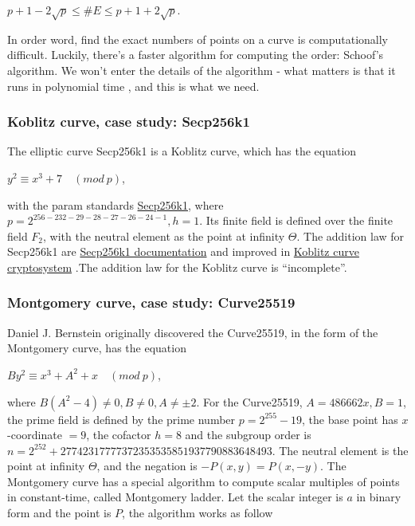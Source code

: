 \begin{center}
  $p+1-2\sqrt{p} \leq \#E \leq p+1+2\sqrt{p}$.
\end{center}

In order word, find the exact numbers of points on a curve is computationally difficult. Luckily, there's a faster algorithm for computing the order: Schoof's algorithm. We won't enter the details of the algorithm - what matters is that it runs in polynomial time \cite{Schoof}, and this is what we need.

\subsubsection{Koblitz curve, case study: Secp256k1}
The elliptic curve Secp256k1 is a Koblitz curve, which has the equation

\begin{center}
  $y^2 \equiv x^3 + 7 \quad (mod \ p)$,
\end{center}

with the param standards \href{https://en.bitcoin.it/wiki/Secp256k1}{Secp256k1}, where $p = 2^{256 - 232 - 29 - 28 - 27 - 26 - 24 - 1}, h = 1$. Its finite field is defined over the finite field $F_2$, with the neutral element as the point at infinity $\Theta$. The addition law for Secp256k1 are \href{https://www.researchgate.net/publication/332783847_Arithmetic_of_Koblitz_Curve_Secp256k1_Used_in_Bitcoin_Cryptocurrency_Based_on_One_Variable_Polynomial_Division}{Secp256k1 documentation} and improved in \href{https://www.researchgate.net/publication/223346975_Koblitz_curve_cryptosystems}{Koblitz curve cryptosystem} .The addition law for the Koblitz curve is “incomplete”.

\subsubsection{Montgomery curve, case study: Curve25519}
Daniel J. Bernstein originally discovered the Curve25519, in the form of the Montgomery curve, has the equation

\begin{center}
  $By^2 \equiv x^3 + A^2 + x \quad (mod \ p)$,
\end{center}

where $B(A^2-4) \neq 0, B \neq 0, A \neq \pm 2$. For the Curve25519, $A = 486662x, B = 1$, the prime field is defined by the prime number $p=2^{255}-19$, the base point has $x$-coordinate $= 9$,  the cofactor $h = 8$ and the subgroup order is $n = 2^{252} + 27742317777372353535851937790883648493$. The neutral element is the point at infinity $\Theta$, and the negation is $-P(x, y) = P(x, -y)$. The Montgomery curve has a special algorithm to compute scalar multiples of points in constant-time, called Montgomery ladder. Let the scalar integer is $a$ in binary form and the point is $P$, the algorithm works as follow

